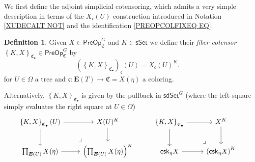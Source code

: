 \documentclass[a4paper,10pt]{article}%
\numberwithin{equation}{section}
\numberwithin{figure}{section}
\theoremstyle{definition} %
\newtheorem{definition}[equation]{Definition}%
\newcommand{\1}{\ensuremath{\mathbbm 1}}%
\begin{document}
We first define the adjoint simplicial cotensoring,
which admits a very simple description in terms
of the $X_{\mathfrak{c}}(U)$ construction introduced in
Notation \ref{XUDECALT NOT}
and the identification 
\eqref{PREOPCOLFIXEQ EQ}.



\begin{definition}
	Given $X \in \mathsf{PreOp}^{G}_{\mathfrak{C}}$ 
	and $K \in \mathsf{sSet}$
	we define their
	\emph{fiber cotensor} 
	$\left\{K, X \right\}_{\mathsf{\mathfrak{C}_{\bullet}}} \in \mathsf{PreOp}^G_{\mathfrak{C}}$
	by
	\begin{equation}\label{EASYCOTEN EQ}
	\left(
	\left\{ K, X \right\}_{\mathsf{\mathfrak{C}_{\bullet}}}
	\right)_{\mathfrak{c}} (U)
	=
	X_{\mathfrak{c}}(U)^K.
	\end{equation}	
	for $U \in \Omega$ a tree and 
	$\mathfrak{c} \colon \boldsymbol{E}(T) \to \mathfrak{C} =  X(\eta)$
	a coloring.
	
	Alternatively, 
	$\left\{K, X \right\}_{\mathsf{\mathfrak{C}_{\bullet}}}$
	is given by the pullback in $\mathsf{sdSet}^G$
	(where the left square simply evaluates the right square
	at $U \in \Omega$)
\begin{equation}
\begin{tikzcd}
	\left\{ K, X \right\}_{\mathsf{\mathfrak{C}_{\bullet}}} (U) \ar{r} \ar{d}
&
	X(U)^K \ar{d}
&%
	\left\{ K, X \right\}_{\mathsf{\mathfrak{C}_{\bullet}}} \ar{r} \ar{d}
&
	X^K \ar{d}
\\
	\prod_{\boldsymbol{E}(U)} X(\eta) \ar{r}
&
	\left(\prod_{\boldsymbol{E}(U)} X(\eta)\right)^K
	\arrow[lu, phantom, "\lrcorner", very near start]
&%
	\mathsf{csk}_{\eta} X  \ar{r}
&
	\left(\mathsf{csk}_{\eta} X\right)^K
	\arrow[lu, phantom, "\lrcorner", very near start]
\end{tikzcd}
\end{equation}
\end{definition}
\end{document}

